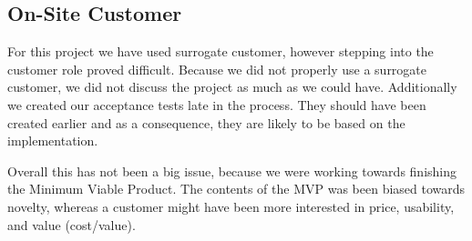 \subsection{On-Site Customer}
For this project we have used surrogate customer, however stepping into the customer role proved difficult. Because we did not properly use a surrogate customer, we did not discuss the project as much as we could have. Additionally we created our acceptance tests late in the process. They should have been created earlier and as a consequence, they are likely to be based on the implementation.

Overall this has not been a big issue, because we were working towards finishing the Minimum Viable Product. The contents of the MVP was been biased towards novelty, whereas a customer might have been more interested in price, usability, and value (cost/value). %
